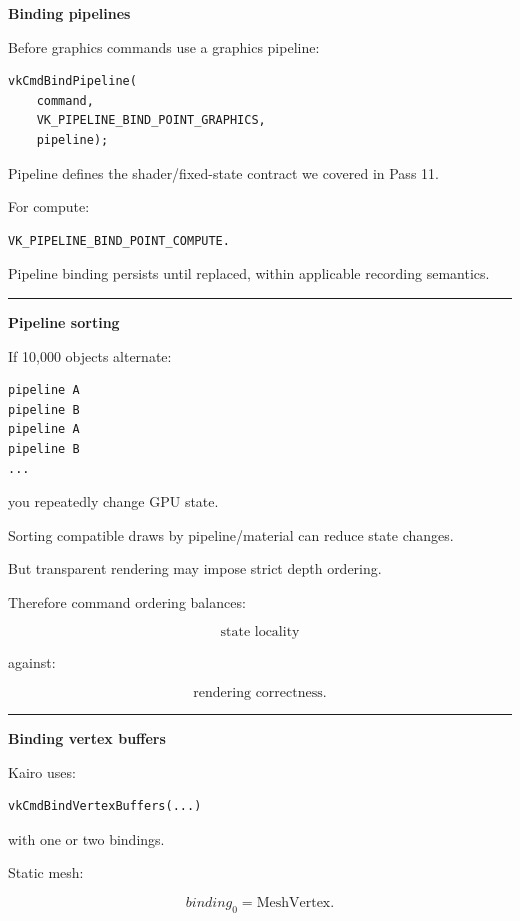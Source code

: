 \textbf{Binding pipelines}

Before graphics commands use a graphics pipeline:

\begin{verbatim}
vkCmdBindPipeline(
    command,
    VK_PIPELINE_BIND_POINT_GRAPHICS,
    pipeline);
\end{verbatim}

Pipeline defines the shader/fixed-state contract we covered in Pass 11.

For compute:

\begin{verbatim}
VK_PIPELINE_BIND_POINT_COMPUTE.
\end{verbatim}

Pipeline binding persists until replaced, within applicable recording semantics.

\begin{center}\rule{0.5\linewidth}{0.5pt}\end{center}

\textbf{Pipeline sorting}

If 10,000 objects alternate:

\begin{verbatim}
pipeline A
pipeline B
pipeline A
pipeline B
...
\end{verbatim}

you repeatedly change GPU state.

Sorting compatible draws by pipeline/material can reduce state changes.

But transparent rendering may impose strict depth ordering.

Therefore command ordering balances:

\[
\boxed{
\text{state locality}
}
\]

against:

\[
\boxed{
\text{rendering correctness}.
}
\]

\begin{center}\rule{0.5\linewidth}{0.5pt}\end{center}

\textbf{Binding vertex buffers}

Kairo uses:

\begin{verbatim}
vkCmdBindVertexBuffers(...)
\end{verbatim}

with one or two bindings.

Static mesh:

\[
binding_0=\text{MeshVertex}.
\]

